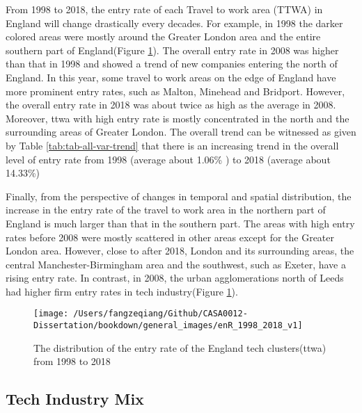 \documentclass[
  12pt,
  oneside]{book}
\begin{document}
From 1998 to 2018, the entry rate of each Travel to work area (TTWA) in England will change drastically every decades. For example, in 1998 the darker colored areas were mostly around the Greater London area and the entire southern part of England(Figure \ref{fig:fig-enR-1998-2018-v1}). The overall entry rate in 2008 was higher than that in 1998 and showed a trend of new companies entering the north of England. In this year, some travel to work areas on the edge of England have more prominent entry rates, such as Malton, Minehead and Bridport. However, the overall entry rate in 2018 was about twice as high as the average in 2008. Moreover, ttwa with high entry rate is mostly concentrated in the north and the surrounding areas of Greater London. The overall trend can be witnessed as given by Table \ref{tab:tab-all-var-trend} that there is an increasing trend in the overall level of entry rate from 1998 (average about 1.06\% ) to 2018
(average about 14.33\%)

Finally, from the perspective of changes in temporal and spatial distribution, the increase in the entry rate of the travel to work area in the northern part of England is much larger than that in the southern part. The areas with high entry rates before 2008 were mostly scattered in other areas except for the Greater London area. However, close to after 2018, London and its surrounding areas, the central Manchester-Birmingham area and the southwest, such as Exeter, have a rising entry rate. In contrast, in 2008, the urban agglomerations north of Leeds had higher firm entry rates in tech industry(Figure \ref{fig:fig-enR-1998-2018-v1}).

\begin{figure}
\texttt{[image: /Users/fangzeqiang/Github/CASA0012-Dissertation/bookdown/general\_images/enR\_1998\_2018\_v1]} \caption{The distribution of the entry rate of the England tech clusters(ttwa) from 1998 to 2018}\label{fig:fig-enR-1998-2018-v1}
\end{figure}

\hypertarget{tech-industry-mix}{%
\subsection{Tech Industry Mix}\label{tech-industry-mix}}
\end{document}

